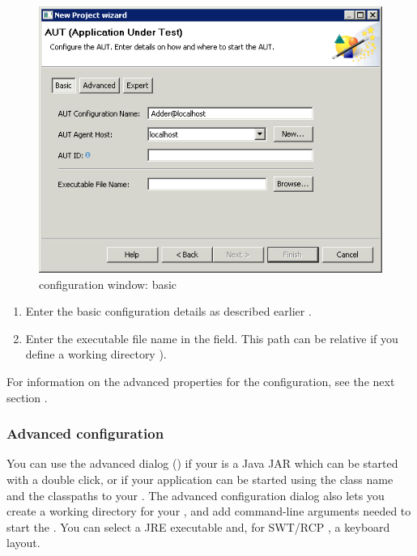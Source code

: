 \begin{figure}[h]
\begin{center}
\includegraphics{Tasks/AUTs/PS/autconfigwindow_basic}
\caption{\gdaut configuration window: basic}
\label{autconfigbasic}
\end{center}
\end{figure}

\begin{enumerate}
\item Enter the basic configuration details as described earlier .
\item Enter the executable file name in the  field. This path can be relative if you define a working directory ).
  
\end{enumerate}
For information on the advanced properties for the \gdaut{} configuration, see the next section . 


\subsubsection{Advanced \gdaut{} configuration}
\label{AdvancedAUTConfig}

You can use the advanced dialog () if your \gdaut{} is a Java JAR which can be started with a double click, or if your application can be started using the class name and the classpaths to your \gdaut{}.  The advanced configuration dialog also lets you create a working directory for your \gdaut{}, and add command-line arguments needed to start the \gdaut{}. You can select a JRE executable and, for SWT/RCP \gdauts{}, a keyboard layout.

